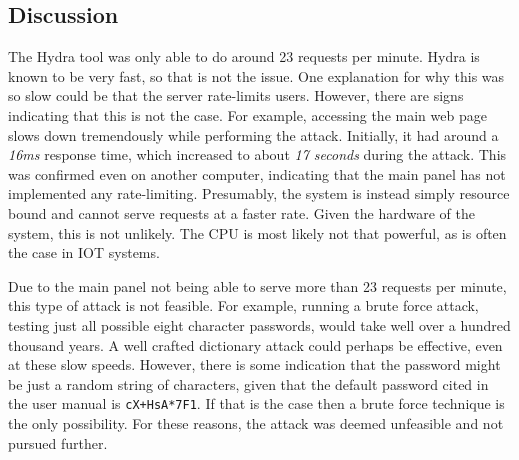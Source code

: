 \subsection{Discussion}
The Hydra tool was only able to do around 23 requests per minute. Hydra is known to be very fast, so that is not the issue. One explanation for why this was so slow could be that the server rate-limits users. However, there are signs indicating that this is not the case. For example, accessing the main web page slows down tremendously while performing the attack. Initially, it had around a \textit{16ms} response time, which increased to about \textit{17 seconds} during the attack. This was confirmed even on another computer, indicating that the main panel has not implemented any rate-limiting. Presumably, the system is instead simply resource bound and cannot serve requests at a faster rate. Given the hardware of the system, this is not unlikely. The CPU is most likely not that powerful, as is often the case in \gls{IOT} systems.
 
Due to the main panel not being able to serve more than 23 requests per minute, this type of attack is not feasible. For example, running a brute force attack, testing just all possible eight character passwords, would take well over a hundred thousand years. A well crafted dictionary attack could perhaps be effective, even at these slow speeds. However, there is some indication that the password might be just a random string of characters, given that the default password cited in the user manual is \texttt{cX+HsA*7F1}. If that is the case then a brute force technique is the only possibility. For these reasons, the attack was deemed unfeasible and not pursued further.
